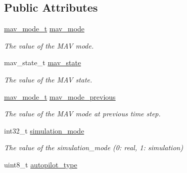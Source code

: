 \subsection*{Public Attributes}
\begin{DoxyCompactItemize}
\item 
\hypertarget{structstate__t_ad4bd3cf9cd5fe8d8643a8c3c5701c663}{\hyperlink{unionmav__mode__t}{mav\+\_\+mode\+\_\+t} \hyperlink{structstate__t_ad4bd3cf9cd5fe8d8643a8c3c5701c663}{mav\+\_\+mode}}\label{structstate__t_ad4bd3cf9cd5fe8d8643a8c3c5701c663}

\begin{DoxyCompactList}\small\item\em The value of the M\+A\+V mode. \end{DoxyCompactList}\item 
\hypertarget{structstate__t_a64686341e91c43a48aaf5dbf5e00ac2c}{mav\+\_\+state\+\_\+t \hyperlink{structstate__t_a64686341e91c43a48aaf5dbf5e00ac2c}{mav\+\_\+state}}\label{structstate__t_a64686341e91c43a48aaf5dbf5e00ac2c}

\begin{DoxyCompactList}\small\item\em The value of the M\+A\+V state. \end{DoxyCompactList}\item 
\hypertarget{structstate__t_aebca1fed22021327f22d05d7ca301233}{\hyperlink{unionmav__mode__t}{mav\+\_\+mode\+\_\+t} \hyperlink{structstate__t_aebca1fed22021327f22d05d7ca301233}{mav\+\_\+mode\+\_\+previous}}\label{structstate__t_aebca1fed22021327f22d05d7ca301233}

\begin{DoxyCompactList}\small\item\em The value of the M\+A\+V mode at previous time step. \end{DoxyCompactList}\item 
\hypertarget{structstate__t_ae98adf252bccb57e22a25ce8315391ff}{int32\+\_\+t \hyperlink{structstate__t_ae98adf252bccb57e22a25ce8315391ff}{simulation\+\_\+mode}}\label{structstate__t_ae98adf252bccb57e22a25ce8315391ff}

\begin{DoxyCompactList}\small\item\em The value of the simulation\+\_\+mode (0\+: real, 1\+: simulation) \end{DoxyCompactList}\item 
\hypertarget{structstate__t_a780dfb1a7d8ceb6e41c7ba13e67a61fa}{uint8\+\_\+t \hyperlink{structstate__t_a780dfb1a7d8ceb6e41c7ba13e67a61fa}{autopilot\+\_\+type}}\label{structstate__t_a780dfb1a7d8ceb6e41c7ba13e67a61fa}


\end{DoxyCompactItemize}
